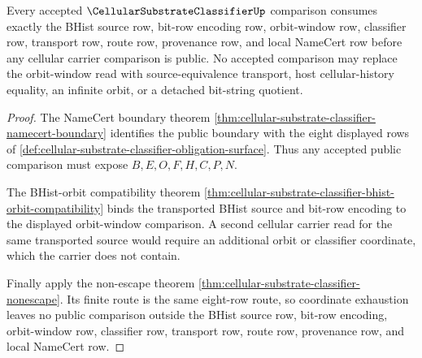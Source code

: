 \begin{theorem}
\label{thm:cellular-substrate-classifier-orbit-window-exhaustion}
Every accepted $\CellularSubstrateClassifierUp$ comparison consumes exactly the BHist source row, bit-row encoding row, orbit-window row, classifier row, transport row, route row, provenance row, and local NameCert row before any cellular carrier comparison is public. No accepted comparison may replace the orbit-window read with source-equivalence transport, host cellular-history equality, an infinite orbit, or a detached bit-string quotient.
\end{theorem}
\begin{proof}
The NameCert boundary theorem \autoref{thm:cellular-substrate-classifier-namecert-boundary} identifies the public boundary with the eight displayed rows of \autoref{def:cellular-substrate-classifier-obligation-surface}. Thus any accepted public comparison must expose $B,E,O,F,H,C,P,N$.

The BHist-orbit compatibility theorem \autoref{thm:cellular-substrate-classifier-bhist-orbit-compatibility} binds the transported BHist source and bit-row encoding to the displayed orbit-window comparison. A second cellular carrier read for the same transported source would require an additional orbit or classifier coordinate, which the carrier does not contain.

Finally apply the non-escape theorem \autoref{thm:cellular-substrate-classifier-nonescape}. Its finite route is the same eight-row route, so coordinate exhaustion leaves no public comparison outside the BHist source row, bit-row encoding, orbit-window row, classifier row, transport row, route row, provenance row, and local NameCert row.
\end{proof}

